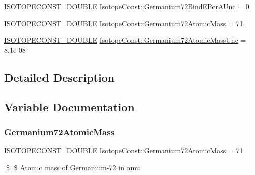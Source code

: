 \begin{DoxyCompactItemize}
\mbox{\hyperlink{group___isotope_const-_macros_ga8f45a7272ce02c0b4c65c44636ed719a}{I\+S\+O\+T\+O\+P\+E\+C\+O\+N\+S\+T\+\_\+\+D\+O\+U\+B\+LE}} \mbox{\hyperlink{group___isotope_const-_germanium-_ge72_gad77b5001c97037ca57738ffcd13abb50}{Isotope\+Const\+::\+Germanium72\+Bind\+E\+Per\+A\+Unc}} = 0.
\item 
\mbox{\hyperlink{group___isotope_const-_macros_ga8f45a7272ce02c0b4c65c44636ed719a}{I\+S\+O\+T\+O\+P\+E\+C\+O\+N\+S\+T\+\_\+\+D\+O\+U\+B\+LE}} \mbox{\hyperlink{group___isotope_const-_germanium-_ge72_ga91259acd74af307a369c73818fa7448c}{Isotope\+Const\+::\+Germanium72\+Atomic\+Mass}} = 71.
\item 
\mbox{\hyperlink{group___isotope_const-_macros_ga8f45a7272ce02c0b4c65c44636ed719a}{I\+S\+O\+T\+O\+P\+E\+C\+O\+N\+S\+T\+\_\+\+D\+O\+U\+B\+LE}} \mbox{\hyperlink{group___isotope_const-_germanium-_ge72_gaf0bda6f674df37706ab087f659f5d3a9}{Isotope\+Const\+::\+Germanium72\+Atomic\+Mass\+Unc}} = 8.\+1e-\/08
\end{DoxyCompactItemize}


\subsection{Detailed Description}


\subsection{Variable Documentation}
\mbox{\label{group___isotope_const-_germanium-_ge72_ga91259acd74af307a369c73818fa7448c}} 
\subsubsection{\texorpdfstring{Germanium72\+Atomic\+Mass}{Germanium72AtomicMass}}
{\footnotesize\ttfamily \mbox{\hyperlink{group___isotope_const-_macros_ga8f45a7272ce02c0b4c65c44636ed719a}{I\+S\+O\+T\+O\+P\+E\+C\+O\+N\+S\+T\+\_\+\+D\+O\+U\+B\+LE}} Isotope\+Const\+::\+Germanium72\+Atomic\+Mass = 71.}

\$ \$ Atomic mass of Germanium-\/72 in amu. \mbox{\label{group___isotope_const-_germanium-_ge72_gaf0bda6f674df37706ab087f659f5d3a9}} 
